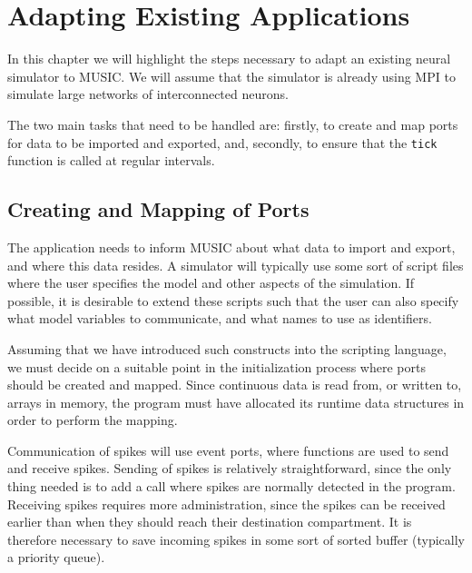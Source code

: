 \documentclass[a4paper]{report}
\begin{document}



\chapter{Adapting Existing Applications}

In this chapter we will highlight the steps necessary to adapt an
existing neural simulator to MUSIC.  We will assume that the simulator
is already using MPI to simulate large networks of interconnected
neurons.

The two main tasks that need to be handled are: firstly, to create and
map ports for data to be imported and exported, and, secondly, to
ensure that the \lstinline|tick| function is called at regular
intervals.


\section{Creating and Mapping of Ports}

The application needs to inform MUSIC about what data to import and
export, and where this data resides.  A simulator will typically use
some sort of script files where the user specifies the model and other
aspects of the simulation.  If possible, it is desirable to extend
these scripts such that the user can also specify what model variables
to communicate, and what names to use as identifiers.

Assuming that we have introduced such constructs into the scripting
language, we must decide on a suitable point in the initialization
process where ports should be created and mapped.  Since continuous
data is read from, or written to, arrays in memory, the program must
have allocated its runtime data structures in order to perform the
mapping.

Communication of spikes will use event ports, where functions are used
to send and receive spikes.  Sending of spikes is relatively
straightforward, since the only thing needed is to add a call where
spikes are normally detected in the program.  Receiving spikes
requires more administration, since the spikes can be received earlier
than when they should reach their destination compartment.  It is
therefore necessary to save incoming spikes in some sort of sorted
buffer (typically a priority queue).
\end{document}
